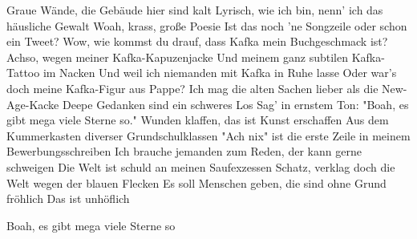 \begin{guitar}
	Graue Wände, die Gebäude hier sind kalt
	Lyrisch, wie ich bin, nenn' ich das häusliche Gewalt
	Woah, krass, große Poesie
	Ist das noch 'ne Songzeile oder schon ein Tweet?
	Wow, wie kommst du drauf, dass Kafka mein Buchgeschmack ist?
	Achso, wegen meiner Kafka-Kapuzenjacke
	Und meinem ganz subtilen Kafka-Tattoo im Nacken
	Und weil ich niemanden mit Kafka in Ruhe lasse
	Oder war's doch meine Kafka-Figur aus Pappe?
	Ich mag die alten Sachen lieber als die New-Age-Kacke
	Deepe Gedanken sind ein schweres Los
	Sag' in ernstem Ton: "Boah, es gibt mega viele Sterne so."
	Wunden klaffen, das ist Kunst erschaffen
	Aus dem Kummerkasten diverser Grundschulklassen
	"Ach nix" ist die erste Zeile in meinem Bewerbungsschreiben
	Ich brauche jemanden zum Reden, der kann gerne schweigen
	Die Welt ist schuld an meinen Saufexzessen
	Schatz, verklag doch die Welt wegen der blauen Flecken
	Es soll Menschen geben, die sind ohne Grund fröhlich
	Das ist unhöflich
	
	 
	
	Boah, es gibt mega viele Sterne so
\end{guitar}
